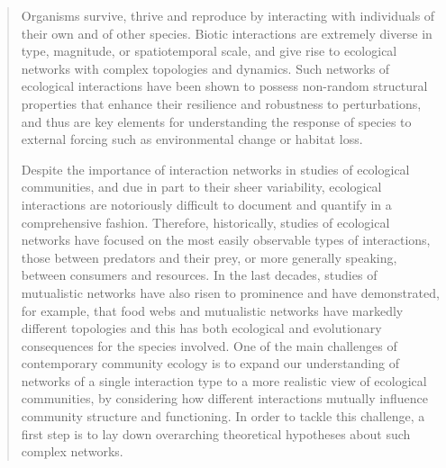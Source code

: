 \documentclass[10pt,a4paper,twoside,fleqn,showtrims]{memoir}
\begin{document}
\begin{abstract}

Organisms survive, thrive and reproduce by interacting with individuals of their own and of other species. Biotic interactions are extremely diverse in type, magnitude, or spatiotemporal scale, and give rise to ecological networks with complex topologies and dynamics. Such networks of ecological interactions have been shown to possess non-random structural properties that enhance their resilience and robustness to perturbations, and thus are key elements for understanding the response of species to external forcing such as environmental change or habitat loss.

Despite the importance of interaction networks in studies of ecological communities, and due in part to their sheer variability, ecological interactions are notoriously difficult to document and quantify in a comprehensive fashion. Therefore, historically, studies of ecological networks have focused on the most easily observable types of interactions, those between predators and their prey, or more generally speaking, between consumers and resources. In the last decades, studies of mutualistic networks have also risen to prominence and have demonstrated, for example, that food webs and mutualistic networks have markedly different topologies and this has both ecological and evolutionary consequences for the species involved. One of the main challenges of contemporary community ecology is to expand our understanding of networks of a single interaction type to a more realistic view of ecological communities, by considering how different interactions mutually influence community structure and functioning. In order to tackle this challenge, a first step is to lay down overarching theoretical hypotheses about such complex networks.


\end{abstract}
\end{document}
